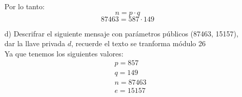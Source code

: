 \documentclass[12pt, letterpaper]{article}
\begin{document}
\begin{itemize}
Por lo tanto:
\[n = p \cdot q\]
\[ 87463 = 587 \cdot 149\]


\item[d)] Descrifrar el siguiente mensaje con parámetros públicos (87463, 15157), dar la llave privada $d$, recuerde el texto se tranforma módulo 26\\

Ya que tenemos los siguientes valores:
\begin{equation*}
\begin{split}
&p = 857\\
&q = 149\\
&n = 87463\\
&e = 15157\\
\end{split}
\end{equation*}


\end{itemize}
\end{document}
